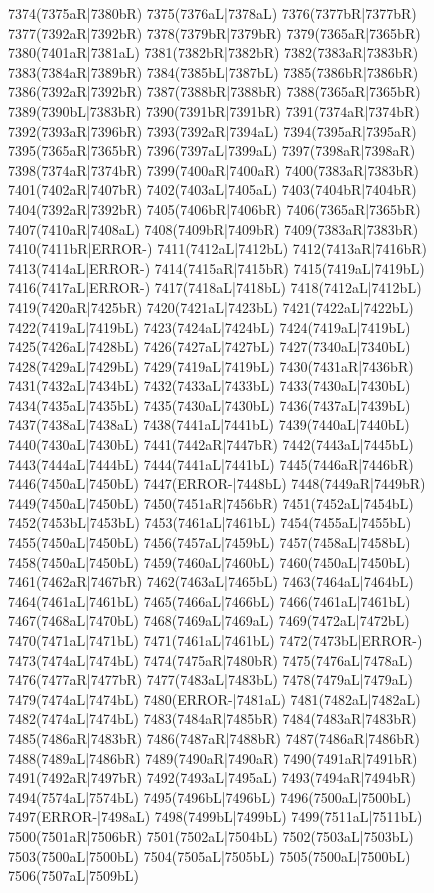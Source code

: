 7374(7375aR|7380bR) 7375(7376aL|7378aL) 7376(7377bR|7377bR) 7377(7392aR|7392bR) 7378(7379bR|7379bR) 7379(7365aR|7365bR) \\7380(7401aR|7381aL) 7381(7382bR|7382bR) 7382(7383aR|7383bR) 7383(7384aR|7389bR) 7384(7385bL|7387bL) 7385(7386bR|7386bR) 7386(7392aR|7392bR) 7387(7388bR|7388bR) 7388(7365aR|7365bR) \\7389(7390bL|7383bR) 7390(7391bR|7391bR) 7391(7374aR|7374bR) 7392(7393aR|7396bR) 7393(7392aR|7394aL) 7394(7395aR|7395aR) 7395(7365aR|7365bR) 7396(7397aL|7399aL) 7397(7398aR|7398aR) \\7398(7374aR|7374bR) 7399(7400aR|7400aR) 7400(7383aR|7383bR) 7401(7402aR|7407bR) 7402(7403aL|7405aL) 7403(7404bR|7404bR) 7404(7392aR|7392bR) 7405(7406bR|7406bR) 7406(7365aR|7365bR) \\7407(7410aR|7408aL) 7408(7409bR|7409bR) 7409(7383aR|7383bR) 7410(7411bR|ERROR-) 7411(7412aL|7412bL) 7412(7413aR|7416bR) 7413(7414aL|ERROR-) 7414(7415aR|7415bR) 7415(7419aL|7419bL) \\7416(7417aL|ERROR-) 7417(7418aL|7418bL) 7418(7412aL|7412bL) 7419(7420aR|7425bR) 7420(7421aL|7423bL) 7421(7422aL|7422bL) 7422(7419aL|7419bL) 7423(7424aL|7424bL) 7424(7419aL|7419bL) \\7425(7426aL|7428bL) 7426(7427aL|7427bL) 7427(7340aL|7340bL) 7428(7429aL|7429bL) 7429(7419aL|7419bL) 7430(7431aR|7436bR) 7431(7432aL|7434bL) 7432(7433aL|7433bL) 7433(7430aL|7430bL) \\7434(7435aL|7435bL) 7435(7430aL|7430bL) 7436(7437aL|7439bL) 7437(7438aL|7438aL) 7438(7441aL|7441bL) 7439(7440aL|7440bL) 7440(7430aL|7430bL) 7441(7442aR|7447bR) 7442(7443aL|7445bL) \\7443(7444aL|7444bL) 7444(7441aL|7441bL) 7445(7446aR|7446bR) 7446(7450aL|7450bL) 7447(ERROR-|7448bL) 7448(7449aR|7449bR) 7449(7450aL|7450bL) 7450(7451aR|7456bR) 7451(7452aL|7454bL) \\7452(7453bL|7453bL) 7453(7461aL|7461bL) 7454(7455aL|7455bL) 7455(7450aL|7450bL) 7456(7457aL|7459bL) 7457(7458aL|7458bL) 7458(7450aL|7450bL) 7459(7460aL|7460bL) 7460(7450aL|7450bL) \\7461(7462aR|7467bR) 7462(7463aL|7465bL) 7463(7464aL|7464bL) 7464(7461aL|7461bL) 7465(7466aL|7466bL) 7466(7461aL|7461bL) 7467(7468aL|7470bL) 7468(7469aL|7469aL) 7469(7472aL|7472bL) \\7470(7471aL|7471bL) 7471(7461aL|7461bL) 7472(7473bL|ERROR-) 7473(7474aL|7474bL) 7474(7475aR|7480bR) 7475(7476aL|7478aL) 7476(7477aR|7477bR) 7477(7483aL|7483bL) 7478(7479aL|7479aL) \\7479(7474aL|7474bL) 7480(ERROR-|7481aL) 7481(7482aL|7482aL) 7482(7474aL|7474bL) 7483(7484aR|7485bR) 7484(7483aR|7483bR) 7485(7486aR|7483bR) 7486(7487aR|7488bR) 7487(7486aR|7486bR) \\7488(7489aL|7486bR) 7489(7490aR|7490aR) 7490(7491aR|7491bR) 7491(7492aR|7497bR) 7492(7493aL|7495aL) 7493(7494aR|7494bR) 7494(7574aL|7574bL) 7495(7496bL|7496bL) 7496(7500aL|7500bL) \\7497(ERROR-|7498aL) 7498(7499bL|7499bL) 7499(7511aL|7511bL) 7500(7501aR|7506bR) 7501(7502aL|7504bL) 7502(7503aL|7503bL) 7503(7500aL|7500bL) 7504(7505aL|7505bL) 7505(7500aL|7500bL) \\7506(7507aL|7509bL) 
